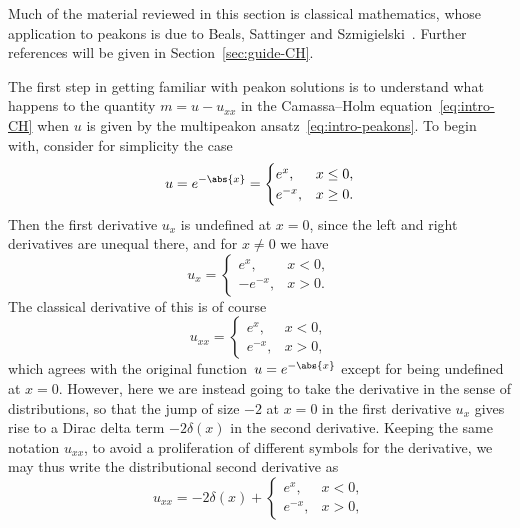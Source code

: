 \documentclass[10pt,a4paper]{article} \pdfoutput=1 
\begin{document}
Much of the material reviewed in this section is classical mathematics,
whose application to peakons is due to
Beals, Sattinger and Szmigielski~\cite{beals-sattinger-szmigielski:1998:acoustic-scattering-KdV-hierarchy,beals-sattinger-szmigielski:1999:stieltjes,beals-sattinger-szmigielski:2000:moment}.
Further references will be given in Section~\ref{sec:guide-CH}.

The first step in getting familiar with peakon solutions is to understand what happens to
the quantity $m = u - u_{xx}$ in the Camassa--Holm equation~\eqref{eq:intro-CH}
when $u$ is given by the multipeakon ansatz~\eqref{eq:intro-peakons}.
To begin with, consider for simplicity the case
\begin{equation*}
  u = e^{-\abs{x}}
  =
  \begin{cases}
    e^x, & x \le 0
    ,\\
    e^{-x}, & x \ge 0
    .
  \end{cases}
\end{equation*}
Then the first derivative $u_x$ is undefined at $x=0$, since the left and right derivatives are unequal there,
and for $x \neq 0$ we have
\begin{equation*}
  u_x =
  \begin{cases}
    e^x, & x < 0
    ,\\
    -e^{-x}, & x > 0
    .
  \end{cases}
\end{equation*}
The classical derivative of this is of course
\begin{equation*}
  u_{xx} =
  \begin{cases}
    e^x, & x < 0
    ,\\
    e^{-x}, & x > 0
    ,
  \end{cases}
\end{equation*}
which agrees with the original function~$u = e^{-\abs{x}}$ except for being undefined at $x=0$.
However, here we are instead going to take the derivative in the sense of distributions,
so that the jump of size $-2$ at $x=0$ in the first derivative $u_x$
gives rise to a Dirac delta term $-2 \delta(x)$ in the second derivative.
Keeping the same notation $u_{xx}$,
to avoid a proliferation of different symbols for the derivative,
we may thus write the distributional second derivative as
\begin{equation*}
  u_{xx} = -2 \delta(x) +
  \begin{cases}
  e^x, & x < 0
  ,\\
  e^{-x}, & x > 0
  ,
  \end{cases}
\end{equation*}
\end{document}
